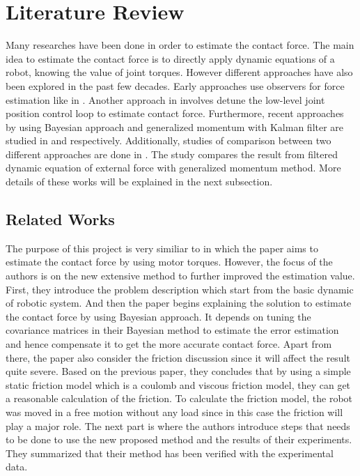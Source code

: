 \chapter{Literature Review}

Many researches have been done in order to estimate the contact force. The main idea to estimate the contact force is to directly apply dynamic equations of a robot, knowing the value of joint torques. However different approaches have also been explored in the past few decades. Early approaches use observers for force estimation like in \cite{Ohi91}. Another approach in \cite{Stolt12} involves detune the low-level joint position control loop to estimate contact force. Furthermore, recent approaches by using Bayesian approach and generalized momentum with Kalman filter are studied in \cite{Hao14} and \cite{Hao15} respectively. Additionally, studies of comparison between two different approaches are done in \cite{Beyl11}. The study compares the result from filtered dynamic equation of external force with generalized momentum method. More details of these works will be explained in the next subsection.

\section{Related Works}

The purpose of this project is very similiar to \cite{Hao14} in which the paper aims to estimate the contact force by using motor torques. However, the focus of the authors is on the new extensive method to further improved the estimation value. First, they introduce the problem description which start from the basic dynamic of robotic system. And then the paper begins explaining the solution to estimate the contact force by using Bayesian approach. It depends on tuning the covariance matrices in their Bayesian method to estimate the error estimation and hence compensate it to get the more accurate contact force. Apart from there, the paper also consider the friction discussion since it will affect the result quite severe. Based on the previous paper, they concludes that by using a simple static friction model which is a coulomb and viscous friction model, they can get a reasonable calculation of the friction. To calculate the friction model, the robot was moved in a free motion without any load since in this case the friction will play a major role. The next part is where the authors introduce steps that needs to be done to use the new proposed method and the results of their experiments. They summarized that their method has been verified with the experimental data.

